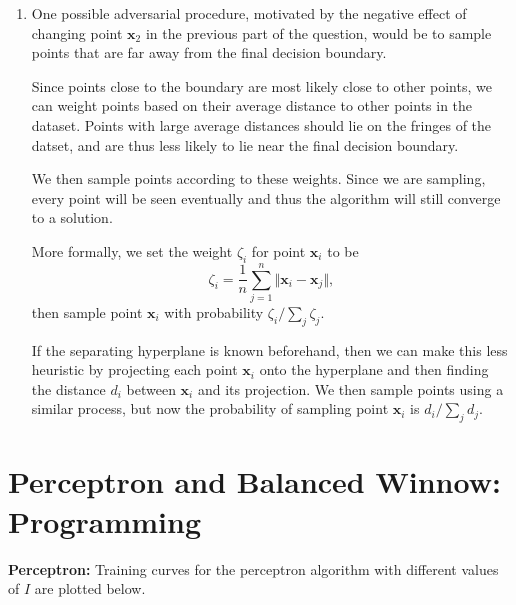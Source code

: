 \documentclass{article}
\begin{document}
\begin{enumerate}
	\item One possible adversarial procedure, motivated by the negative effect of changing point $\mathbf{x}_2$ in the previous part of the question, would be to sample points that are far away from the final decision boundary.

		Since points close to the boundary are most likely close to other points, we can weight points based on their average distance to other points in the dataset. Points with large average distances should lie on the fringes of the datset, and are thus less likely to lie near the final decision boundary.

		We then sample points according to these weights. Since we are sampling, every point will be seen eventually and thus the algorithm will still converge to a solution.

		More formally, we set the weight $\zeta_i$ for point $\mathbf{x}_i$ to be
		 \[
		\zeta_i = \frac{1}{n} \sum_{j=1}^n \Vert{\mathbf{x}_i - \mathbf{x}_j}\Vert,
		\] then sample point $\mathbf{x}_i$ with probability $\zeta_i / \sum_j \zeta_j$.

		If the separating hyperplane is known beforehand, then we can make this less heuristic by projecting each point $\mathbf{x}_i$ onto the hyperplane and then finding the distance $d_i$ between $\mathbf{x}_i$ and its projection. We then sample points using a similar process, but now the probability of sampling point $\mathbf{x}_i$ is $d_i / \sum_{j} d_j$.
\end{enumerate}




\section{Perceptron and Balanced Winnow: Programming}

\textbf{Perceptron:} 
Training curves for the perceptron algorithm with different values of $I$ are plotted below.
\end{document}
